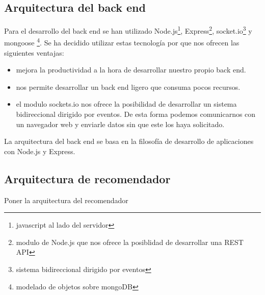 \subsection{Arquitectura del back end}
\thispagestyle{empty}

Para el desarrollo del back end se han utilizado Node.js\footnote{javascript al lado del servidor}, Express\footnote{modulo de Node.js que nos ofrece la posiblidad de desarrollar una REST API}, socket.io\footnote{sistema bidireccional dirigido por eventos} y mongoose \footnote{modelado de objetos sobre mongoDB}. Se ha decidido utilizar estas tecnología por que nos ofrecen las siguientes ventajas:

\begin{itemize}
	\item mejora la productividad a la hora de desarrollar nuestro propio back end.
	\item nos permite desarrollar un back end ligero que consuma pocos recursos.
	\item el modulo sockets.io nos ofrece la posibilidad de desarrollar un sistema bidireccional dirigido por eventos. De esta forma podemos comunicarnos con un navegador web y enviarle datos sin que este los haya solicitado.
\end{itemize}

La arquitectura del back end se basa en la filosofía de desarrollo de aplicaciones con Node.js y Express. 

\subsection{Arquitectura de recomendador}
\thispagestyle{empty}

Poner la arquitectura del recomendador
